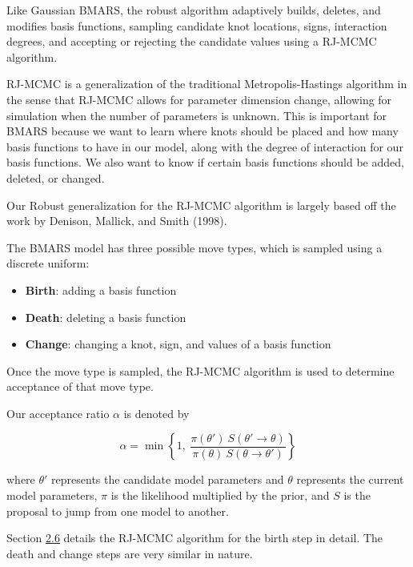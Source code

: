 \documentclass[
]{article}
\begin{document}
Like Gaussian BMARS, the robust algorithm adaptively builds, deletes,
and modifies basis functions, sampling candidate knot locations, signs,
interaction degrees, and accepting or rejecting the candidate values
using a RJ-MCMC algorithm.\newline

RJ-MCMC is a generalization of the traditional Metropolis-Hastings
algorithm in the sense that RJ-MCMC allows for parameter dimension
change, allowing for simulation when the number of parameters is
unknown. This is important for BMARS because we want to learn where
knots should be placed and how many basis functions to have in our
model, along with the degree of interaction for our basis functions. We
also want to know if certain basis functions should be added, deleted,
or changed.\newline

Our Robust generalization for the RJ-MCMC algorithm is largely based off
the work by Denison, Mallick, and Smith (1998).\newline

The BMARS model has three possible move types, which is sampled using a
discrete uniform:

\begin{itemize}
\item
  \textbf{Birth}: adding a basis function
\item
  \textbf{Death}: deleting a basis function
\item
  \textbf{Change}: changing a knot, sign, and values of a basis function
\end{itemize}

Once the move type is sampled, the RJ-MCMC algorithm is used to
determine acceptance of that move type.

Our acceptance ratio \(\alpha\) is denoted by

\begin{equation}
\label{TBD}
\alpha = \min\left\lbrace 
1,\
\frac{\pi(\theta') \ S(\theta'\rightarrow\theta)}{\pi(\theta)\ S(\theta\rightarrow\theta')} 
\right\rbrace
\end{equation}

where \(\theta'\) represents the candidate model parameters and
\(\theta\) represents the current model parameters, \(\pi\) is the
likelihood multiplied by the prior, and \(S\) is the proposal to jump
from one model to another.

Section \protect\hyperlink{birth}{2.6} details the RJ-MCMC algorithm for
the birth step in detail. The death and change steps are very similar in
nature.
\end{document}
